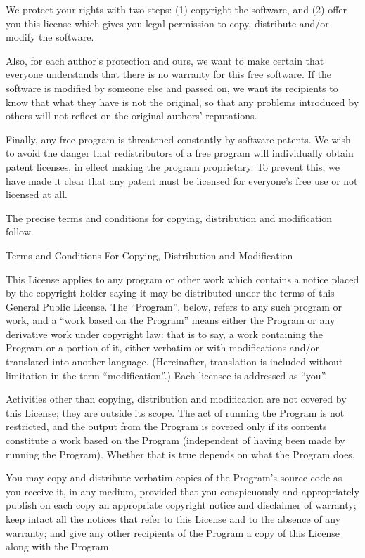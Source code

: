 \begin{lrbox}{\gpl}
\begin{minipage}{3\textwidth}
We protect your rights with two steps: (1) copyright the software, and (2)
offer you this license which gives you legal permission to copy,
distribute and/or modify the software.

Also, for each author's protection and ours, we want to make certain that
everyone understands that there is no warranty for this free software.  If
the software is modified by someone else and passed on, we want its
recipients to know that what they have is not the original, so that any
problems introduced by others will not reflect on the original authors'
reputations.

Finally, any free program is threatened constantly by software patents.
We wish to avoid the danger that redistributors of a free program will
individually obtain patent licenses, in effect making the program
proprietary.  To prevent this, we have made it clear that any patent must
be licensed for everyone's free use or not licensed at all.

The precise terms and conditions for copying, distribution and
modification follow.

\begincentered
  {\Large \sc Terms and Conditions For Copying, Distribution and
   Modification}
\endcentered

\beginenumeration
\item
This License applies to any program or other work which contains a notice
placed by the copyright holder saying it may be distributed under the
terms of this General Public License.  The ``Program'', below, refers to
any such program or work, and a ``work based on the Program'' means either
the Program or any derivative work under copyright law: that is to say, a
work containing the Program or a portion of it, either verbatim or with
modifications and/or translated into another language.  (Hereinafter,
translation is included without limitation in the term ``modification''.)
Each licensee is addressed as ``you''.

Activities other than copying, distribution and modification are not
covered by this License; they are outside its scope.  The act of
running the Program is not restricted, and the output from the Program
is covered only if its contents constitute a work based on the
Program (independent of having been made by running the Program).
Whether that is true depends on what the Program does.

\item You may copy and distribute verbatim copies of the Program's source
  code as you receive it, in any medium, provided that you conspicuously
  and appropriately publish on each copy an appropriate copyright notice
  and disclaimer of warranty; keep intact all the notices that refer to
  this License and to the absence of any warranty; and give any other
  recipients of the Program a copy of this License along with the Program.


\end{minipage}
\end{lrbox}
